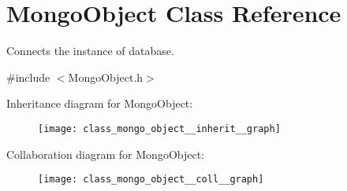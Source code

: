 \hypertarget{class_mongo_object}{}\section{Mongo\+Object Class Reference}
\label{class_mongo_object}


Connects the instance of database.  




{\ttfamily \#include $<$Mongo\+Object.\+h$>$}



Inheritance diagram for Mongo\+Object\+:
\nopagebreak
\begin{figure}[H]
\begin{center}
\leavevmode
\texttt{[image: class\_mongo\_object\_\_inherit\_\_graph]}
\end{center}
\end{figure}


Collaboration diagram for Mongo\+Object\+:
\nopagebreak
\begin{figure}[H]
\begin{center}
\leavevmode
\texttt{[image: class\_mongo\_object\_\_coll\_\_graph]}
\end{center}
\end{figure}
